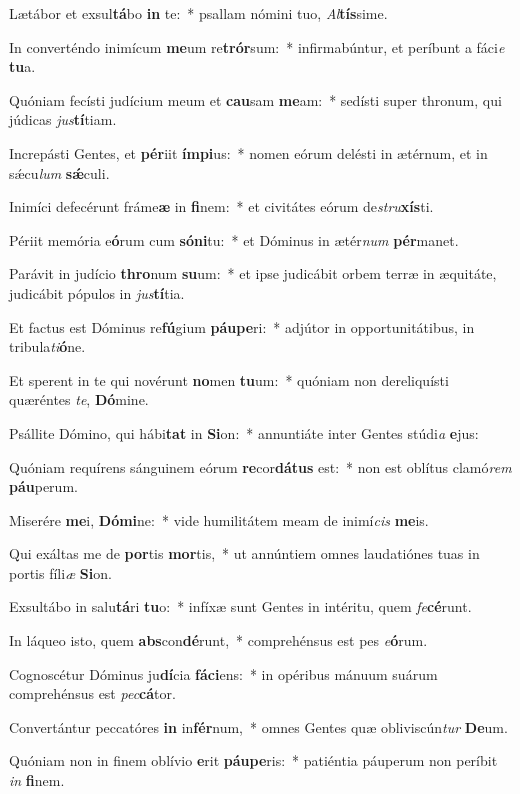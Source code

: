 \item Lætábor et exsul\textbf{tá}bo \textbf{in} te:~* psallam nómini tuo, \textit{Al}\textbf{tís}sime.
\item In converténdo inimícum \textbf{me}um re\textbf{trór}sum:~* infirmabúntur, et períbunt a fáci\textit{e} \textbf{tu}a.
\item Quóniam fecísti judícium meum et \textbf{cau}sam \textbf{me}am:~* sedísti super thronum, qui júdicas \textit{jus}\textbf{tí}tiam.
\item Increpásti Gentes, et \textbf{pér}iit \textbf{ím}\textbf{pi}us:~* nomen eórum delésti in ætérnum, et in sǽcu\textit{lum} \textbf{sǽ}culi.
\item Inimíci defecérunt fráme\textbf{æ} in \textbf{fi}nem:~* et civitátes eórum de\textit{stru}\textbf{xís}ti.
\item Périit memória e\textbf{ó}rum cum \textbf{só}\textbf{ni}tu:~* et Dóminus in ætér\textit{num} \textbf{pér}manet.
\item Parávit in judício \textbf{thro}num \textbf{su}um:~* et ipse judicábit orbem terræ in æquitáte, judicábit pópulos in \textit{jus}\textbf{tí}tia.
\item Et factus est Dóminus re\textbf{fú}gium \textbf{páu}\textbf{pe}ri:~* adjútor in opportunitátibus, in tribula\textit{ti}\textbf{ó}ne.
\item Et sperent in te qui novérunt \textbf{no}men \textbf{tu}um:~* quóniam non dereliquísti quæréntes \textit{te}, \textbf{Dó}mine.
\item Psállite Dómino, qui hábi\textbf{tat} in \textbf{Si}on:~* annuntiáte inter Gentes stúdi\textit{a} \textbf{e}jus:
\item Quóniam requírens sánguinem eórum \textbf{re}cor\textbf{dá}\textbf{tus} est:~* non est oblítus clamó\textit{rem} \textbf{páu}perum.
\item Miserére \textbf{me}i, \textbf{Dó}\textbf{mi}ne:~* vide humilitátem meam de inimí\textit{cis} \textbf{me}is.
\item Qui exáltas me de \textbf{por}tis \textbf{mor}tis,~* ut annúntiem omnes laudatiónes tuas in portis fíli\textit{æ} \textbf{Si}on.
\item Exsultábo in salu\textbf{tá}ri \textbf{tu}o:~* infíxæ sunt Gentes in intéritu, quem \textit{fe}\textbf{cé}runt.
\item In láqueo isto, quem \textbf{abs}con\textbf{dé}runt,~* comprehénsus est pes \textit{e}\textbf{ó}rum.
\item Cognoscétur Dóminus ju\textbf{dí}cia \textbf{fá}\textbf{ci}ens:~* in opéribus mánuum suárum comprehénsus est \textit{pec}\textbf{cá}tor.
\item Convertántur peccatóres \textbf{in} in\textbf{fér}num,~* omnes Gentes quæ obliviscún\textit{tur} \textbf{De}um.
\item Quóniam non in finem oblívio \textbf{e}rit \textbf{páu}\textbf{pe}ris:~* patiéntia páuperum non períbit \textit{in} \textbf{fi}nem.
